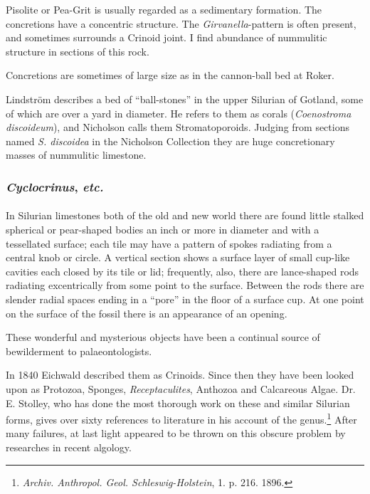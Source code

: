 \documentclass[a4paper, 12pt, oneside]{article}
\begin{document}
Pisolite or Pea-Grit is usually regarded as a sedimentary formation. The concretions have a concentric structure. The \emph{Girvanella}-pattern is often present, and sometimes surrounds a Crinoid joint. I find abundance of nummulitic structure in sections of this rock.

Concretions are sometimes of large size as in the cannon-ball bed at Roker.

Lindström describes a bed of ``ball-stones'' in the upper Silurian of Gotland, some of which are over a yard in diameter. He refers to them as corals (\emph{Coenostroma discoideum}), and Nicholson calls them Stromatoporoids. Judging from sections named \emph{S. discoidea} in the Nicholson Collection they are huge concretionary masses of nummulitic limestone.

\subsubsection{\emph{Cyclocrinus}, \emph{etc.}}
\paragraph{}
In Silurian limestones both of the old and new world there are found little stalked spherical or pear-shaped bodies an inch or more in diameter and with a tessellated surface; each tile may have a pattern of spokes radiating from a central knob or circle. A vertical section shows a surface layer of small cup-like cavities each closed by its tile or lid; frequently, also, there are lance-shaped rods radiating excentrically from some point to the surface. Between the rods there are slender radial spaces ending in a ``pore'' in the floor of a surface cup. At one point on the surface of the fossil there is an appearance of an opening.

These wonderful and mysterious objects have been a continual source of bewilderment to palaeontologists.

In 1840 Eichwald described them as Crinoids. Since then they have been looked upon as Protozoa, Sponges, \emph{Receptaculites}, Anthozoa and Calcareous Algae. Dr. E. Stolley, who has done the most thorough work on these and similar Silurian forms, gives over sixty references to literature in his account of the genus.\footnote{\emph{Archiv. Anthropol. Geol. Schleswig-Holstein}, 1. p. 216. 1896.} After many failures, at last light appeared to be thrown on this obscure problem by researches in recent algology.
\end{document}
